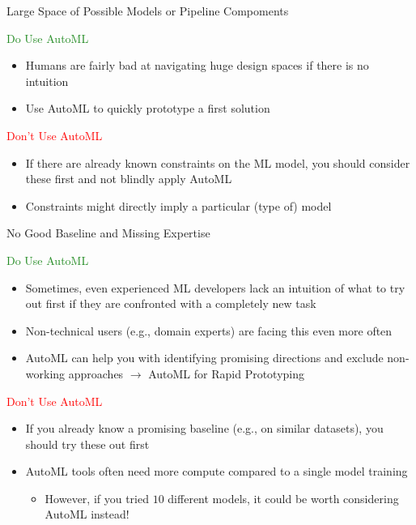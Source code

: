 \documentclass[main]{subfiles}
\begin{document}
\begin{frame}[c]{Large Space of Possible Models or Pipeline Compoments}

\textcolor{ForestGreen}{Do Use AutoML}
\begin{itemize}
    \item Humans are fairly bad at navigating huge design spaces if there is no intuition
    \item[$\leadsto$] Use AutoML to quickly prototype a first solution
\end{itemize}

\pause

\textcolor{Red}{Don't Use AutoML}

\begin{itemize}
    \item If there are already known constraints on the ML model, you should consider these first and not blindly apply AutoML
    \item[$\leadsto$] Constraints might directly imply a particular (type of) model
\end{itemize}

\end{frame}
\begin{frame}[c]{No Good Baseline and Missing Expertise}

\textcolor{ForestGreen}{Do Use AutoML}
\begin{itemize}
    \item Sometimes, even experienced ML developers lack an intuition of what to try out first if they are confronted with a completely new task
    \item Non-technical users (e.g., domain experts) are facing this even more often
    \item[\leadsto] AutoML can help you with identifying promising directions and exclude non-working approaches $\to$ AutoML for Rapid Prototyping
\end{itemize}

\pause

\textcolor{Red}{Don't Use AutoML}

\begin{itemize}
    \item If you already know a promising baseline (e.g., on similar datasets), you should try these out first
    \item AutoML tools often need more compute compared to a single model training
    \begin{itemize}
        \item However, if you tried $10$ different models, it could be worth considering AutoML instead!
    \end{itemize}
\end{itemize}

\end{frame}
\end{document}
